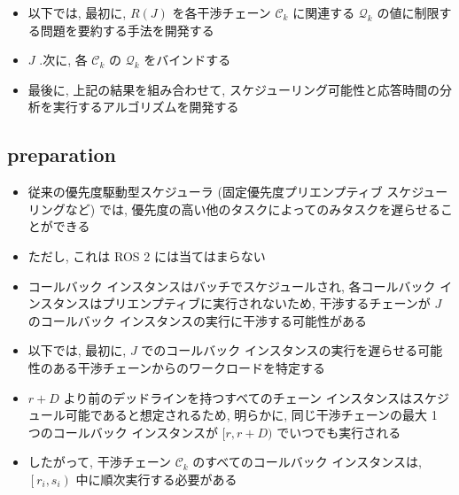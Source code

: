 \begin{frame}{}
    \begin{itemize}
        \item 以下では, 最初に, $R(J)$ を各干渉チェーン $\mathcal{C}_{k}$ に関連する $\mathcal{Q}_{k}$ の値に制限する問題を要約する手法を開発する
        \item $J$ .次に, 各 $\mathcal{C}_{k}$ の $\mathcal{Q}_{k}$ をバインドする
        \item 最後に, 上記の結果を組み合わせて, スケジューリング可能性と応答時間の分析を実行するアルゴリズムを開発する
    \end{itemize}
\end{frame}


\subsection{preparation}
\label{ssec: preparation}

\begin{frame}{}
    \begin{itemize}
        \item 従来の優先度駆動型スケジューラ (固定優先度プリエンプティブ スケジューリングなど) では, 優先度の高い他のタスクによってのみタスクを遅らせることができる
        \item ただし, これは ROS 2 には当てはまらない
        \item コールバック インスタンスはバッチでスケジュールされ, 各コールバック インスタンスはプリエンプティブに実行されないため, 干渉するチェーンが $J$ のコールバック インスタンスの実行に干渉する可能性がある
        \item 以下では, 最初に, $J$ でのコールバック インスタンスの実行を遅らせる可能性のある干渉チェーンからのワークロードを特定する
    \end{itemize}
\end{frame}

\begin{frame}{}
    \begin{itemize}
        \item  $r+D$ より前のデッドラインを持つすべてのチェーン インスタンスはスケジュール可能であると想定されるため, 明らかに, 同じ干渉チェーンの最大 1 つのコールバック インスタンスが $[r, r+D)$ でいつでも実行される
        \item したがって, 干渉チェーン $\mathcal{C}_{k}$ のすべてのコールバック インスタンスは, $\left[r_{i}, s_{i}\right)$ 中に順次実行する必要がある
    \end{itemize}
\end{frame}

